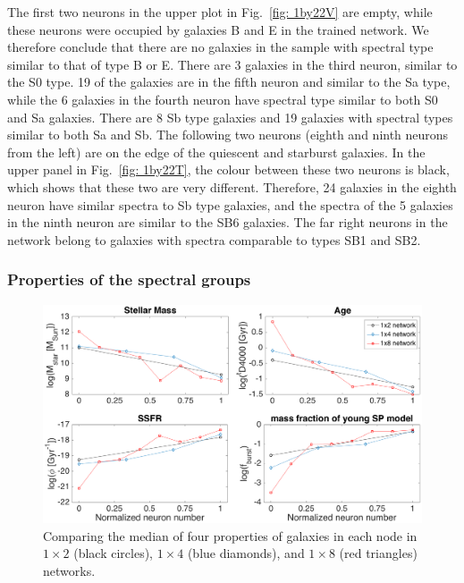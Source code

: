             The first two neurons in the upper plot in Fig.~\ref{fig: 1by22V} are empty, while these neurons were occupied by galaxies B and E in the trained network.
            We therefore conclude that there are no galaxies in the  sample with spectral type similar to that of type B or E.
            There are 3 galaxies in the third neuron, similar to the S0 type. 
            19 of the galaxies are in the fifth neuron and similar to the Sa type, while the 6 galaxies in the fourth neuron have spectral type similar to both S0 and Sa galaxies.
            There are 8 Sb type galaxies and 19 galaxies with spectral types similar to both Sa and Sb.
            The following two neurons (eighth and ninth neurons from the left) are on the edge of the quiescent and starburst galaxies.
            In the upper panel in Fig.~\ref{fig: 1by22T}, the colour between these two neurons is black, which shows that these two are very different.
            Therefore, 24 galaxies in the eighth neuron have similar spectra to Sb type galaxies, and the spectra of the 5 galaxies in the ninth neuron are similar to the SB6 galaxies.
            The far right neurons in the network belong to galaxies with spectra comparable to types SB1 and SB2.
            
            
    
    \subsubsection{Properties of the spectral groups}
       
       \begin{figure}
            \centering
            \includegraphics[width=\textwidth]{images0.01/1d/props5.png}
            \caption[The median of four properties of galaxies in three networks]{Comparing the median of four properties of galaxies in each node in $1\times2$ (black circles), $1\times4$ (blue diamonds), and $1\times8$ (red triangles) networks.}
            \label{fig: props}
        \end{figure} 
        
